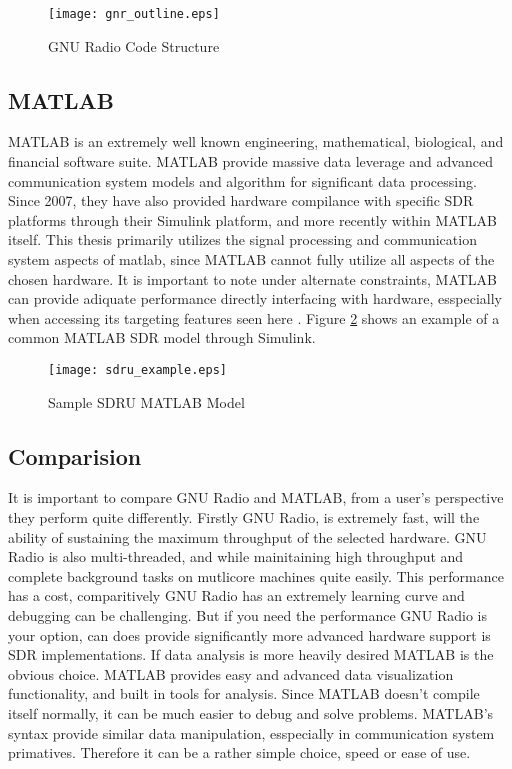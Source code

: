 \begin{figure}\label{gnr_struct}
\centering
\texttt{[image: gnr\_outline.eps]}
\caption{GNU Radio Code Structure}
\end{figure}

\subsection{MATLAB}

MATLAB is an extremely well known engineering, mathematical, biological, and financial software suite.  MATLAB provide massive data leverage and advanced communication system models and algorithm for significant data processing.  Since 2007, they have also provided hardware compilance with specific SDR platforms through their Simulink platform, and more recently within MATLAB itself\cite{matlabsdru}.  This thesis primarily utilizes the signal processing and communication system aspects of matlab, since MATLAB cannot fully utilize all aspects of the chosen hardware.  It is important to note under alternate constraints, MATLAB can provide adiquate performance directly interfacing with hardware, esspecially when accessing its targeting features seen here \cite{matlabtargeting}.  Figure \ref{sdru_example} shows an example of a common MATLAB SDR model through Simulink.\\

\begin{figure}[!ht]\label{sdru_example}
\centering
\texttt{[image: sdru\_example.eps]}
\caption{Sample SDRU MATLAB Model}
\end{figure}

\subsection{Comparision}

It is important to compare GNU Radio and MATLAB, from a user's perspective they perform quite differently.  Firstly GNU Radio, is extremely fast, will the ability of sustaining the maximum throughput of the selected hardware.  GNU Radio is also multi-threaded, and while mainitaining high throughput and complete background tasks on mutlicore machines quite easily.  This performance has a cost, comparitively GNU Radio has an extremely learning curve and debugging can be challenging.  But if you need the performance GNU Radio is your option, can does provide significantly more advanced hardware support is SDR implementations.  If data analysis is more heavily desired MATLAB is the obvious choice.  MATLAB provides easy and advanced data visualization functionality, and built in tools for analysis.  Since MATLAB doesn't compile itself normally, it can be much easier to debug and solve problems.  MATLAB's syntax provide similar data manipulation, esspecially in communication system primatives.  Therefore it can be a rather simple choice, speed or ease of use.\\ 

